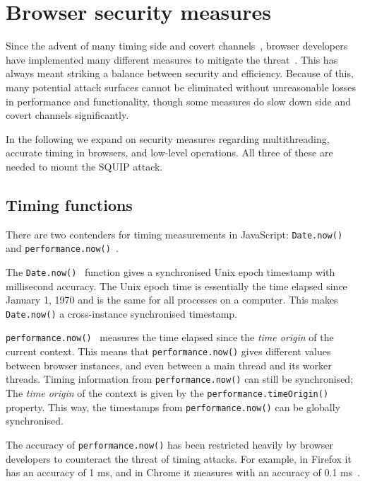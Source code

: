 \documentclass[11pt,
  titlepage=false,
  parskip=half,      %
]{scrreprt}
\begin{document}
\section{Browser security measures}
\label{sec:browsersecurity}
Since the advent of many timing side and covert channels~\cite{noack2018exploiting, Rokicki2022webport, gruss2016rowhammer, 185126},
browser developers have implemented many different measures to mitigate the threat~\cite{shusterman2021prime, performancenow, performancenowchrome, schwarz2018javascript}.
This has always meant striking a balance between security and efficiency.
Because of this, many potential attack surfaces cannot be eliminated without unreasonable losses in performance and functionality,
though some measures do slow down side and covert channels significantly.

In the following we expand on security measures regarding multithreading, accurate timing in browsers, and low-level operations.
All three of these are needed to mount the SQUIP attack.


\subsection{Timing functions}\label{subsec:timingjs}
There are two contenders for timing measurements in JavaScript: \texttt{Date.now()}~\cite{datenow} and \texttt{performance.now()}~\cite{performancenow}.

The \texttt{Date.now()}~\cite{datenow} function gives a synchronised Unix epoch timestamp with millisecond accuracy.
The Unix epoch time is essentially the time elapsed since January 1, 1970 and is the same for all processes on a computer.
This makes \texttt{Date.now()} a cross-instance synchronised timestamp.

\texttt{performance.now()}~\cite{performancenow} measures the time elapsed since the \textit{time origin} of the current context.
This means that \texttt{performance.now()} gives different values between browser instances, and even between a main thread and its worker threads.
Timing information from \texttt{performance.now()} can still be synchronised;
The \textit{time origin} of the context is given by the \texttt{performance.timeOrigin()}~\cite{performancetimeorigin} property.
This way, the timestamps from \texttt{performance.now()} can be globally synchronised.

The accuracy of \texttt{performance.now()} has been restricted heavily by browser developers to counteract the threat of timing attacks.
For example, in Firefox it has an accuracy of 1 ms, and in Chrome it measures with an accuracy of 0.1 ms~\cite{performancenow, performancenowchrome}.
\end{document}
